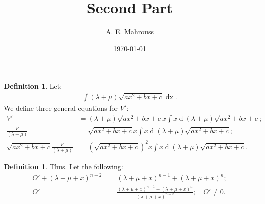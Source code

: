 \documentclass[10pt]{article}
\title{Second Part}
\author{A. E. Mahrouss}
\date{\today}
\theoremstyle{plain}
\theoremstyle{definition}
\newtheorem{definition}[theorem]{Definition}
\theoremstyle{remark}
\begin{document}
\begin{definition}
	Let:
	\begin{align*}
		\int (\lambda + \mu)\sqrt{ax^2 + bx  +c} \operatorname{dx}.
	\end{align*}
	We define three general equations for $V'$:
	\begin{align*}
		V' &= (\lambda + \mu)\sqrt{ax^2 + bx  +c}x \int x \operatorname{d}(\lambda + \mu)\sqrt{ax^2 + bx  +c};\\
		\frac{V'}{(\lambda + \mu)} &= \sqrt{ax^2 + bx  +c}x \int x \operatorname{d}(\lambda + \mu)\sqrt{ax^2 + bx  +c};\\
		\sqrt{ax^2 + bx  +c}\frac{V'}{(\lambda + \mu)} &= (\sqrt{ax^2 + bx  +c})^{2}x \int x \operatorname{d}(\lambda + \mu)\sqrt{ax^2 + bx  +c}.
	\end{align*}
\end{definition}
\begin{definition}
	Thus. Let the following:
	\begin{align*}
		O' + (\lambda + \mu + x)^{n-2} &= (\lambda + \mu + x)^{n-1} + (\lambda + \mu + x)^{n};\\
		O' &= \frac{(\lambda + \mu + x)^{n-1} + (\lambda + \mu + x)^{n}}{(\lambda + \mu + x)^{n-2}}; \quad O' \neq 0.
	\end{align*}
\end{definition}

\nocite{*}


\end{document}
